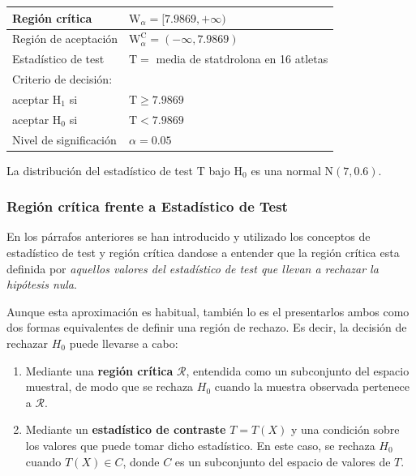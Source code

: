 \documentclass[
]{article}
\begin{document}
\begin{longtable}[]{@{}
  >{\raggedright\arraybackslash}p{}
  >{\centering\arraybackslash}p{}@{}}
\toprule\noalign{}
\begin{minipage}[b]{\linewidth}\raggedright
Región crítica
\end{minipage} & \begin{minipage}[b]{\linewidth}\centering
\(\mathrm{W}_{\alpha}=[7.9869,+\infty)\)
\end{minipage} \\
\midrule\noalign{}
\endhead
\bottomrule\noalign{}
\endlastfoot
Región de aceptación & \(\mathrm{W}_{\alpha}^{\mathrm{C}}=(-\infty, 7.9869)\) \\
Estadístico de test & \(\mathrm{T}=\) media de statdrolona en 16 atletas \\
Criterio de decisión: & \\
aceptar \(\mathrm{H}_{1}\) si & \(\mathrm{T} \geq 7.9869\) \\
aceptar \(\mathrm{H}_{0}\) si & \(\mathrm{T}<7.9869\) \\
Nivel de significación & \(\alpha=0.05\) \\
\end{longtable}

La distribución del estadístico de test T bajo \(\mathrm{H}_{0}\) es una normal \(\mathrm{N}(7,0.6)\).

\subsubsection{Región crítica frente a Estadístico de Test}\label{regiuxf3n-cruxedtica-frente-a-estaduxedstico-de-test}

En los párrafos anteriores se han introducido y utilizado los conceptos de estadístico de test y región crítica dandose a entender que la región crítica esta definida por \emph{aquellos valores del estadístico de test que llevan a rechazar la hipótesis nula}.

Aunque esta aproximación es habitual, también lo es el presentarlos ambos como dos formas equivalentes de definir una región de rechazo. Es decir, la decisión de rechazar \(H_0\) puede llevarse a cabo:

\begin{enumerate}
\def\labelenumi{\arabic{enumi}.}
\item
  Mediante una \textbf{región crítica} \(\mathcal{R}\), entendida como un subconjunto del espacio muestral, de modo que se rechaza \(H_0\) cuando la muestra observada pertenece a \(\mathcal{R}\).
\item
  Mediante un \textbf{estadístico de contraste} \(T=T(X)\) y una condición sobre los valores que puede tomar dicho estadístico. En este caso, se rechaza \(H_0\) cuando \(T(X)\in C\), donde \(C\) es un subconjunto del espacio de valores de \(T\).
\end{enumerate}
\end{document}
